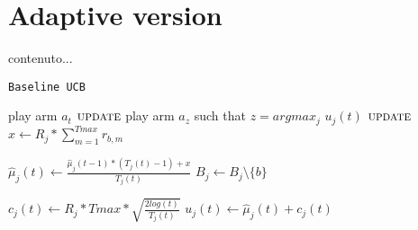 \section{Adaptive version}























































\iffalse
	contenuto...




\begin{algorithm}[!h]
	\caption{\texttt{Baseline UCB}}
	\begin{scriptsize}
		\begin{algorithmic}[1]
			
			
			\Statex
			 
				\State play arm $a_t$\;
				\State $\textsc{update}$
			\EndFor
			 
				\State play arm $a_z$ such that  $z = argmax_j$ $u_j (t)$\;
				\State $\textsc{update}$
			\EndFor
			\EndFunction
			\Statex
						\State$x \gets   R_j * \sum_{m=1}^{Tmax}r_{b,m} $\;
						
						\State$\hat{\mu}_j(t) \gets \frac{\hat{\mu}_j(t-1)*(T_j(t)-1)+x}{T_j(t)}$\;
						\State$B_j \gets B_j \setminus \{b\}$\;	
										
					\EndIf				
				\EndFor			
				
			\State$c_j(t)\gets R_j * Tmax * \sqrt{\frac{2log(t)}{T_j(t)}}$\;
			\State$u_j(t) \gets  \hat{\mu}_j(t) +  c_j(t)$
			\EndFor
			
			
			
			
			\EndFunction
			
		\end{algorithmic}
	\end{scriptsize}
	\label{alg:BaselineUCB}
\end{algorithm}


